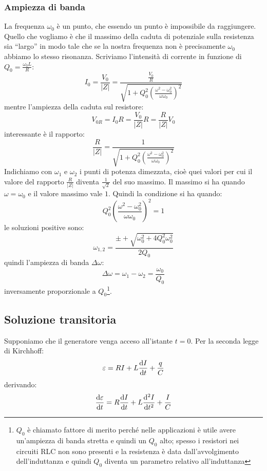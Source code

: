 \subsubsection{Ampiezza di banda}
La frequenza $\omega_0$ è un punto, che essendo un punto è impossibile da raggiungere. Quello che vogliamo è che il massimo della caduta di potenziale sulla resistenza sia ``largo'' in modo tale che se la nostra frequenza non è precisamente $\omega_0$ abbiamo lo stesso risonanza. Scriviamo l'intensità di corrente in funzione di $Q_0=\frac{\omega_0L}{R}$:
\begin{equation}
  I_0=\frac{V_0}{|Z|}=\frac{\frac{V_0}{R}}{\sqrt{1+Q_0^2\left(\frac{\omega^2-\omega_0^2}{\omega\omega_0}\right)^2}}
\end{equation}
mentre l'ampiezza della caduta sul resistore:
\begin{equation}
  V_{0R}=I_0R=\frac{V_0}{|Z|}R=\frac{R}{|Z|}V_0
\end{equation}
interessante è il rapporto:
\begin{equation}
  \frac{R}{|Z|}=\frac{1}{\sqrt{1+Q_0^2\left(\frac{\omega^2-\omega_0^2}{\omega\omega_0}\right)^2}}
\end{equation}
Indichiamo con $\omega_1$ e $\omega_2$ i punti di potenza dimezzata, cioè quei valori per cui il valore del rapporto $\frac{R}{|Z|}$ diventa $\frac{1}{\sqrt{2}}$ del suo massimo. Il massimo si ha quando $\omega=\omega_0$ e il valore massimo vale $1$. Quindi la condizione si ha quando:
\begin{equation}
  Q_0^2\left(\frac{\omega^2-\omega_0^2}{\omega\omega_0}\right)^2=1
\end{equation}
le soluzioni positive sono:
\begin{equation}
  \omega_{1,2}=\frac{\pm+\sqrt{\omega_0^2+4Q_0^2\omega_0^2}}{2Q_0}
\end{equation}
quindi l'ampiezza di banda $\Delta\omega$:
\begin{equation}
  \Delta\omega=\omega_1-\omega_2=\frac{\omega_0}{Q_0}
\end{equation}
inversamente proporzionale a $Q_0$\footnote{$Q_0$ è chiamato fattore di merito perché nelle applicazioni è utile avere un'ampiezza di banda stretta e quindi un $Q_0$ alto; spesso i resistori nei circuiti RLC non sono presenti e la resistenza è data dall'avvolgimento dell'induttanza e quindi $Q_0$ diventa un parametro relativo all'induttanza}.

\subsection{Soluzione transitoria}
Supponiamo che il generatore venga acceso all'istante $t=0$. Per la seconda legge di Kirchhoff:
\begin{equation}
  \varepsilon=RI+L\frac{\mathrm{d} I}{\mathrm{d} t}+\frac{q}{C}
\end{equation}
derivando:
\begin{equation}
  \frac{\mathrm{d} \varepsilon}{\mathrm{d} t}=R\frac{\mathrm{d} I}{\mathrm{d} t}+L\frac{\mathrm{d}^2 I}{\mathrm{d} t^2}+\frac{I}{C}
\end{equation}


